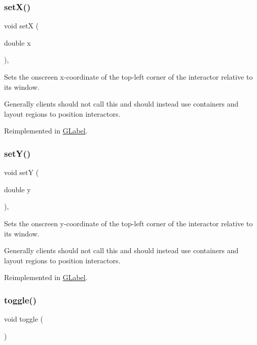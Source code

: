 \subsubsection{\texorpdfstring{set\+X()}{setX()}}
{\footnotesize\ttfamily void setX (\begin{DoxyParamCaption}\item[{double}]{x }\end{DoxyParamCaption})\hspace{0.3cm}{\ttfamily [virtual]}, {\ttfamily [inherited]}}



Sets the onscreen x-\/coordinate of the top-\/left corner of the interactor relative to its window. 

Generally clients should not call this and should instead use containers and layout regions to position interactors. 

Reimplemented in \mbox{\hyperlink{classGLabel_a173837ba805eaa2411e88834869d3a9c}{G\+Label}}.

\mbox{\label{classGInteractor_a7d57e2a5c35d27feb58fd498a3cf82b9}} 
\subsubsection{\texorpdfstring{set\+Y()}{setY()}}
{\footnotesize\ttfamily void setY (\begin{DoxyParamCaption}\item[{double}]{y }\end{DoxyParamCaption})\hspace{0.3cm}{\ttfamily [virtual]}, {\ttfamily [inherited]}}



Sets the onscreen y-\/coordinate of the top-\/left corner of the interactor relative to its window. 

Generally clients should not call this and should instead use containers and layout regions to position interactors. 

Reimplemented in \mbox{\hyperlink{classGLabel_a0b738606c7aca5c472b66c4e55b3c685}{G\+Label}}.

\mbox{\label{classGCheckBox_ad277193b2dca0bab1e0ad24d45407dc3}} 
\subsubsection{\texorpdfstring{toggle()}{toggle()}}
{\footnotesize\ttfamily void toggle (\begin{DoxyParamCaption}{ }\end{DoxyParamCaption})\hspace{0.3cm}{\ttfamily [virtual]}}



